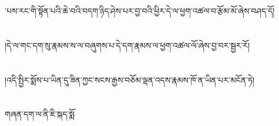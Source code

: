 ་པས་རང་གི་སྟོན་པའི་ཆེ་བའི་བདག་ཉིད་ཤེས་པར་བྱ་བའི་ཕྱིར་དེ་ལ་ཕྱག་འཚལ་བ་རྩོམ་མོ་ཞེས་བཤད་དོ།\chapter{ }།དེ་ལ་གང་དག་སུ་རྣམས་ས་ལ་བཞུགས་པ་དེ་དག་རྣམས་ལ་ཕྱག་འཚལ་ལོ་ཞེས་བྱ་བར་སྦྱར་རོ།\chapter{ }།འདི་སྤྱིར་སྨོས་པ་ཡིན་དུ་ཟིན་ཀྱང་སངས་རྒྱས་བཅོམ་ལྡན་འདས་རྣམས་ཁོ་ན་ཡིན་པར་མངོན་ཏེ།\chapter{ }གཞན་དག་ལ་ནི་ཇི་སྐད་སྨོ
